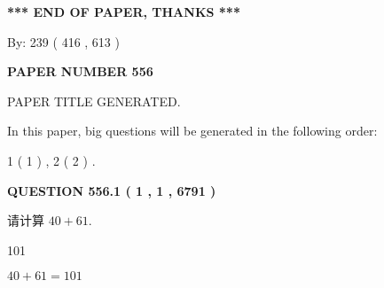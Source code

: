\documentclass{ctexart}
\begin{document}
   
   
   
\vspace{1.0in} 
{\textbf{\large{ *** END OF PAPER, THANKS *** }}} 
   
   
\hspace{1.0in} By: 
 239 ( 416 ,  613 )
   
   
   
   
\newpage 
\setcounter{page}{ 
   556001 } 
   
   
   
   
 {\textbf{ \Large{ PAPER NUMBER  556  }}}
   
   
\vspace{0.2in}
   
   
   
   
   
   
   
   
 \vspace{0.2in}
 
 
 
 
   
   
 PAPER TITLE GENERATED.
   
   
   
\vspace{0.2in}
   
In this paper, big questions will be generated in the following order: 
   
   
   1 ( 1 )
 ,
   2 ( 2 )
 .
  
\vspace{0.2in}
  
{\textbf{\Large{QUESTION
556.1 
 ( 1 , 1 , 6791 )
}}}
  
  
 
请计算 $ %
40 +  %
61 $.
 
 
 
\noindent{}
 
 

101
 
 
\noindent{}
 
 

 
 
 
\noindent{}
 
 

$ %
40 +  %
61=   %
101$
 
\end{document}
